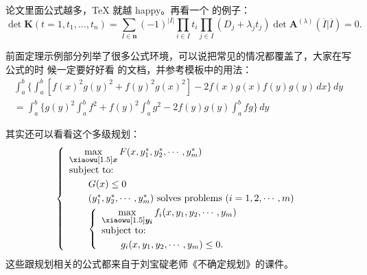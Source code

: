 论文里面公式越多，\TeX{} 就越 happy。再看一个  的例子：
\newcommand{\envert}[1]{\left\lvert#1\right\rvert} 
\begin{equation}\label{detK2}
\det\mathbf{K}(t=1,t_1,\dots,t_n)=\sum_{I\in\mathbf{n}}(-1)^{\envert{I}}
\prod_{i\in I}t_i\prod_{j\in I}(D_j+\lambda_jt_j)\det\mathbf{A}
^{(\lambda)}(\overline{I}|\overline{I})=0.
\end{equation} 

前面定理示例部分列举了很多公式环境，可以说把常见的情况都覆盖了，大家在写公式的时
候一定要好好看  的文档，并参考模板中的用法：
\begin{multline*}%
\int_a^b\biggl\{\int_a^b[f(x)^2g(y)^2+f(y)^2g(x)^2]
 -2f(x)g(x)f(y)g(y)\,dx\biggr\}\,dy \\
 =\int_a^b\biggl\{g(y)^2\int_a^bf^2+f(y)^2
  \int_a^b g^2-2f(y)g(y)\int_a^b fg\biggr\}\,dy
\end{multline*}

其实还可以看看这个多级规划：
\begin{equation}\label{bilevel}
\left\{\begin{array}{l}
\max\limits_{{\mbox{\footnotesize\boldmath $x$}}} F(x,y_1^*,y_2^*,\cdots,y_m^*)\\[0.2cm]
\mbox{subject to:}\\[0.1cm]
\qquad G(x)\le 0\\[0.1cm]
\qquad(y_1^*,y_2^*,\cdots,y_m^*)\mbox{ solves problems }(i=1,2,\cdots,m)\\[0.1cm]
\qquad\left\{\begin{array}{l}
    \max\limits_{{\mbox{\footnotesize\boldmath $y_i$}}}f_i(x,y_1,y_2,\cdots,y_m)\\[0.2cm]
    \mbox{subject to:}\\[0.1cm]
    \qquad g_i(x,y_1,y_2,\cdots,y_m)\le 0.
    \end{array}\right.
\end{array}\right.
\end{equation}
这些跟规划相关的公式都来自于刘宝碇老师《不确定规划》的课件。
